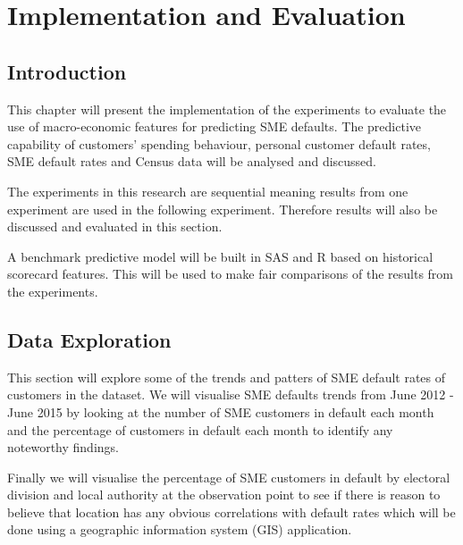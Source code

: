 
\chapter{Implementation and Evaluation} %

\label{Chapter5} %


\section{Introduction}
This chapter will present the implementation of the experiments to evaluate the use of macro-economic features for predicting SME defaults. The predictive capability of customers' spending behaviour, personal customer default rates, SME default rates and Census data  will be analysed and discussed.

The experiments in this research are sequential meaning results from one experiment are used in the following experiment. Therefore results will also be discussed and evaluated in this section.

A benchmark predictive model will be built in SAS and R based on historical scorecard features. This will be used to make fair comparisons of the results from the experiments.


\section{Data Exploration}\label{sec:Dataexplor}

This section will explore some of the trends and patters of SME default rates of customers in the dataset. We will visualise SME defaults trends from June 2012 - June 2015 by looking at the number of SME customers in default each month and the percentage of customers in default each month to identify any noteworthy findings.

Finally we will visualise the percentage of SME customers in default by electoral division and local authority at the observation point to see if there is reason to believe that location has any obvious correlations with default rates which will be done using a geographic information system (GIS) application.

